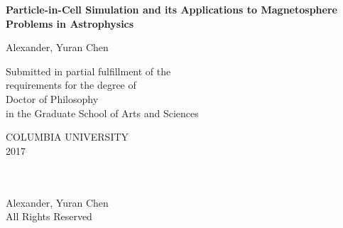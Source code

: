 
\newcommand{\thesistitle}{Particle-in-Cell Simulation and its Applications
 \protect\linebreak[1]to Magnetosphere Problems in Astrophysics}
\newcommand{\thesisauthor}{Alexander, Yuran Chen}
\newcommand{\thesisyear}{2017}


$\phantom{a}$

$\phantom{a}$

$\phantom{a}$

\begin{center}

{\LARGE \bf \thesistitle}

\vskip1.0in

{\Large  \thesisauthor} \vskip0.5in

\vskip1.5in

\large
Submitted in partial fulfillment of the \\
requirements for the degree of \\
Doctor of Philosophy \\
in the Graduate School of Arts and Sciences \\

\vskip0.5in

COLUMBIA UNIVERSITY \\
\thesisyear \\

\end{center}
\clearpage

\begin{center}
\ \\
\vskip6.5in
\textcopyright \thesisyear \\[3mm]
\thesisauthor \\
All Rights Reserved
\end{center}
\clearpage

